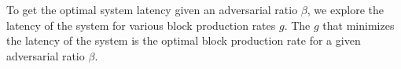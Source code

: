 To get the optimal system latency given an adversarial ratio $\beta$, we explore the latency of the system for various block production rates $g$.
The $g$ that minimizes the latency of the system is the optimal block production rate for a given adversarial ratio $\beta$.




%
%

